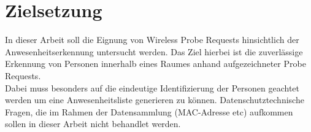 \section{Zielsetzung}

In dieser Arbeit soll die Eignung von Wireless Probe Requests hinsichtlich der Anwesenheitserkennung untersucht werden.
Das Ziel hierbei ist die zuverlässige Erkennung von Personen innerhalb eines Raumes anhand aufgezeichneter Probe Requests.
\\

Dabei muss besonders auf die eindeutige Identifizierung der Personen geachtet werden um eine Anwesenheitsliste generieren zu können.
Datenschutztechnische Fragen, die im Rahmen der Datensammlung (MAC-Adresse etc) aufkommen sollen in dieser Arbeit nicht behandlet werden.
